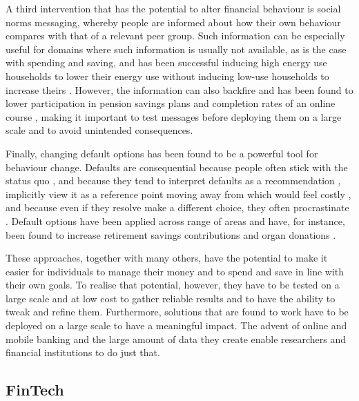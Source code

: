 A third intervention that has the potential to alter financial behaviour is
social norms messaging, whereby people are informed about how their own
behaviour compares with that of a relevant peer group. Such information can be
especially useful for domains where such information is usually not available,
as is the case with spending and saving, and has been successful inducing high
energy use households to lower their energy use without inducing low-use
households to increase theirs \citep{schultz2007constructive,
allcott2011social, allcott2014short, brandon2017effects}. However, the
information can also backfire and has been found to lower participation in
pension savings plans \citep{beshears2015effect} and completion rates of an
online course \citep{rogers2016discouraged}, making it important to test
messages before deploying them on a large scale and to avoid unintended
consequences.

Finally, changing default options has been found to be a powerful tool for
behaviour change. Defaults are consequential because people often stick
with the status quo \citet{samuelson1988status}, and because they tend to
interpret defaults as a recommendation \citep{mckenzie2006recommendations},
implicitly view it as a reference point moving away from which would feel
costly \citet{johnson2003defaults, kahneman1979prospect}, and because even if
they resolve make a different choice, they often procrastinate
\citet{carroll2009optimal, ericson2017interaction}. Default options have been
applied across range of areas and have, for instance, been found to increase
retirement savings contributions \citep{madrian2001power,
beshears2009importance} and organ donations \citep{johnson2003defaults,
gimbel2003presumed, abadie2006impact}.

These approaches, together with many others, have the potential to make it
easier for individuals to manage their money and to spend and save in line with
their own goals. To realise that potential, however, they have to be tested on
a large scale and at low cost to gather reliable results and to have the
ability to tweak and refine them. Furthermore, solutions that are found to work
have to be deployed on a large scale to have a meaningful impact. The advent of
online and mobile banking and the large amount of data they create enable
researchers and financial institutions to do just that.


\subsection{FinTech}%
\label{sub:large_scale_data_and_fintech}

